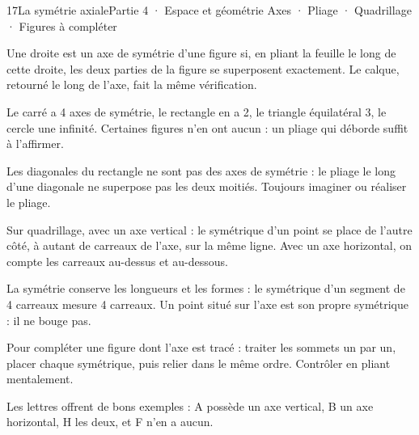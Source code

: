 \begin{ouverture}[geometrie]{17}{La symétrie axiale}{Partie 4 · Espace et géométrie}
{Axes · Pliage · Quadrillage · Figures à compléter}
\end{ouverture}
\pagestyle{otMain}\essentiel\fontsize{11}{15}\selectfont
{}\label{cours-17-1}
\begin{definition}Une droite est un axe de symétrie d’une figure si, en pliant la feuille le long de cette droite, les deux parties de la figure se superposent exactement. Le calque, retourné le long de l’axe, fait la même vérification.\end{definition}
\label{fig-cours-17-1-cours-symetrie}

\begin{exemple}Le carré a 4 axes de symétrie, le rectangle en a 2, le triangle équilatéral 3, le cercle une infinité. Certaines figures n’en ont aucun : un pliage qui déborde suffit à l’affirmer.\end{exemple}
\begin{attention}Les diagonales du rectangle ne sont pas des axes de symétrie : le pliage le long d’une diagonale ne superpose pas les deux moitiés. Toujours imaginer ou réaliser le pliage.\end{attention}
\clearpage
{}\label{cours-17-2}
\begin{savoirfaire}Sur quadrillage, avec un axe vertical : le symétrique d’un point se place de l’autre côté, à autant de carreaux de l’axe, sur la même ligne. Avec un axe horizontal, on compte les carreaux au-dessus et au-dessous.\end{savoirfaire}
\begin{propriete}La symétrie conserve les longueurs et les formes : le symétrique d’un segment de 4 carreaux mesure 4 carreaux. Un point situé sur l’axe est son propre symétrique : il ne bouge pas.\end{propriete}
\begin{savoirfaire}Pour compléter une figure dont l’axe est tracé : traiter les sommets un par un, placer chaque symétrique, puis relier dans le même ordre. Contrôler en pliant mentalement.\end{savoirfaire}
\begin{exemple}Les lettres offrent de bons exemples : A possède un axe vertical, B un axe horizontal, H les deux, et F n’en a aucun.\end{exemple}

